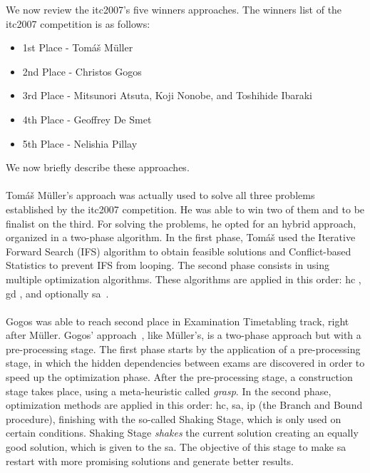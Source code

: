 We now review the \gls{itc2007}'s five winners approaches. The winners list of the \gls{itc2007} competition is as follows:
\begin{itemize}
	\item 1st Place - Tom\'{a}\v{s} M\"{u}ller
	\item 2nd Place - Christos Gogos
	\item 3rd Place - Mitsunori Atsuta, Koji Nonobe, and Toshihide Ibaraki
	\item 4th Place - Geoffrey De Smet
	\item 5th Place - Nelishia Pillay
\end{itemize}
We now briefly describe these approaches.\\
\\
Tom\'{a}\v{s} M\"{u}ller's approach \cite{Mueller2009} was actually used to solve all three problems established by the \gls{itc2007} competition. He was able to win two of them and to be finalist on the third. For solving the problems, he opted for an hybrid approach, organized in a two-phase algorithm. In the first phase, Tom\'{a}\v{s} used the Iterative Forward Search (IFS) algorithm \cite{Mueller2005} to obtain feasible solutions and Conflict-based Statistics \cite{Mueller2004} to prevent IFS from looping. The second phase consists in using multiple optimization algorithms. These algorithms are applied in this order: \gls{hc} \cite{Russell2010}, \gls{gd} \cite{Dueck1993}, and optionally \gls{sa}~\cite{Kirkpatrick1983}.\\
\\
Gogos was able to reach second place in Examination Timetabling track, right after M\"{u}ller. Gogos' approach~\cite{Gogos2012}, like M\"{u}ller's, is a two-phase approach but with a pre-processing stage. The first phase starts by the application of a pre-processing stage, in which the hidden dependencies between exams are discovered in order to speed up the optimization phase. After the pre-processing stage, a construction stage takes place, using a meta-heuristic called \textit{\gls{grasp}}. In the second phase, optimization methods are applied in this order: \gls{hc}, \gls{sa}, \gls{ip} (the Branch and Bound procedure), finishing with the so-called Shaking Stage, which is only used on certain conditions. Shaking Stage \textit{shakes} the current solution creating an equally good solution, which is given to the \gls{sa}. The objective of this stage to make \gls{sa} restart with more promising solutions and generate better results.\\
\\
